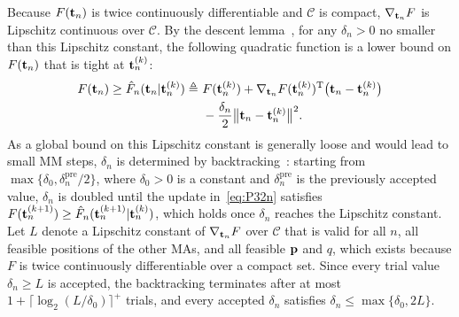 \documentclass[journal]{IEEEtran}
\newcommand{\rev}[1]{{\color{red}#1}}
\newcommand{\rev}[1]{#1}
\begin{document}
Because $F(\mathbf{t}_n)$ is twice continuously differentiable and $\mathcal C$ is compact, $\nabla_{\mathbf{t}_n}F$ is Lipschitz continuous over $\mathcal C$. By the descent lemma~\cite[Lemma~5.7]{Beck2017}, for any $\delta_n>0$ no smaller than this Lipschitz constant, the following quadratic function is a lower bound on $F(\mathbf{t}_n)$ that is tight at $\mathbf{t}_n^{(k)}$:
\begin{align}
F(\bt_n)\ge\hat F_n(\bt_n|\bt_n^{(k)})\triangleq\ &F(\bt_n^{(k)})+\nabla_{\bt_n}F(\bt_n^{(k)})^{\mathrm T}\big(\bt_n-\bt_n^{(k)}\big)\nonumber\\
&-\frac{\delta_n}{2}\big\|\bt_n-\bt_n^{(k)}\big\|^2.\label{eq:surrogate}
\end{align}
As a global bound on this Lipschitz constant is generally loose and would lead to small MM steps, $\delta_n$ is determined by backtracking~\cite{Beck2017}: starting from $\max\{\delta_0,\delta_n^{\mathrm{pre}}/2\}$, where $\delta_0>0$ is a constant and $\delta_n^{\mathrm{pre}}$ is the previously accepted value, $\delta_n$ is doubled until the update in~\eqref{eq:P32n} satisfies $F(\mathbf{t}_n^{(k+1)})\ge\hat F_n(\mathbf{t}_n^{(k+1)}|\mathbf{t}_n^{(k)})$, which holds once $\delta_n$ reaches the Lipschitz constant. \rev{Let $L$ denote a Lipschitz constant of $\nabla_{\mathbf{t}_n}F$ over $\mathcal C$ that is valid for all $n$, all feasible positions of the other MAs, and all feasible $\mathbf{p}$ and $q$, which exists because $F$ is twice continuously differentiable over a compact set. Since every trial value $\delta_n\ge L$ is accepted, the backtracking terminates after at most $1+\lceil\log_2(L/\delta_0)\rceil^+$ trials, and every accepted $\delta_n$ satisfies $\delta_n\le\max\{\delta_0,2L\}$.}
\end{document}
